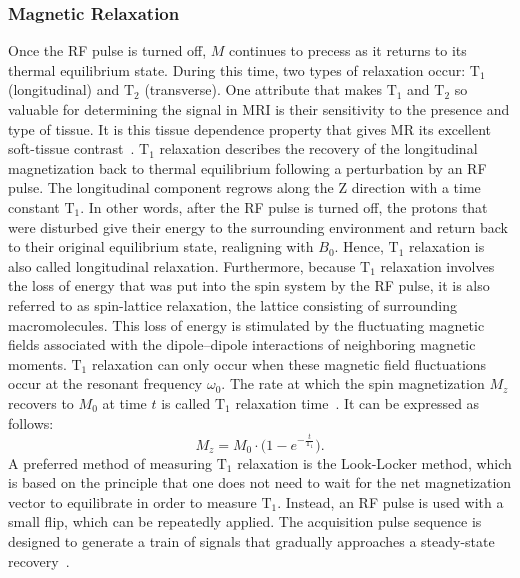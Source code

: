 \subsubsection{Magnetic Relaxation}
Once the RF pulse is turned off, $M$ continues to precess as it returns to its thermal equilibrium state. During this time, two types of relaxation occur: $\text{T}_1$ (longitudinal) and $\text{T}_2$ (transverse). One attribute that makes $\text{T}_1$ and $\text{T}_2$ so valuable for determining the signal in MRI is their sensitivity to the presence and type of tissue. It is this tissue dependence property that gives MR its excellent soft-tissue contrast~\cite{Serai2021}. $\text{T}_1$ relaxation describes the recovery of the longitudinal magnetization back to thermal equilibrium following a perturbation by an RF pulse. The longitudinal component regrows along the Z direction with a time constant $\text{T}_1$. In other words, after the RF pulse is turned off, the protons that were disturbed give their energy to the surrounding environment and return back to their original equilibrium state, realigning with $B_0$. Hence, $\text{T}_1$ relaxation is also called longitudinal relaxation. Furthermore, because $\text{T}_1$ relaxation involves the loss of energy that was put into the spin system by the RF pulse, it is also referred to as spin-lattice relaxation, the lattice consisting of surrounding macromolecules. This loss of energy is stimulated by the fluctuating magnetic fields associated with the dipole–dipole interactions of neighboring magnetic moments. $\text{T}_1$ relaxation can only occur when these magnetic field fluctuations occur at the resonant frequency $\omega_0$. The rate at which the spin magnetization $M_z$ recovers to $M_0$ at time $t$ is called $\text{T}_1$ relaxation time~\cite{Serai2021}. It can be expressed as follows:
\begin{equation}
	M_z = M_0 \cdot \bigg(1 - e^{-\frac{t}{\text{T}_1}} \bigg).
\end{equation}
A preferred method of measuring $\text{T}_1$ relaxation is the Look-Locker method, which is based on the principle that one does not need to wait for the net magnetization vector to equilibrate in order to measure $\text{T}_1$. Instead, an RF pulse is used with a small flip, which can be repeatedly applied. The acquisition pulse sequence is designed to generate a train of signals that gradually approaches a steady-state recovery~\cite{Serai2021}. 


